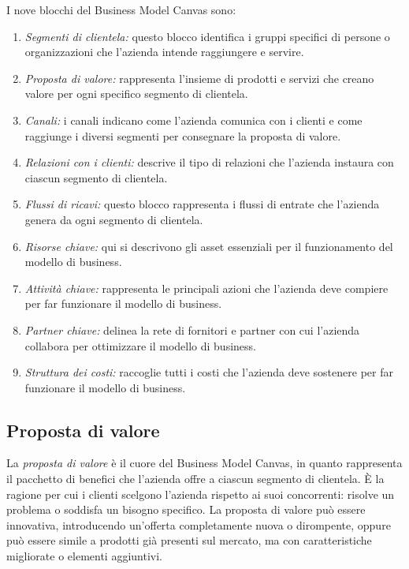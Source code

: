 I nove blocchi del Business Model Canvas sono:
\begin{enumerate}
    \item \textit{Segmenti di clientela:} questo blocco identifica i gruppi specifici di persone o organizzazioni che l'azienda intende raggiungere e servire.
    \item \textit{Proposta di valore:} rappresenta l'insieme di prodotti e servizi che creano valore per ogni specifico segmento di clientela.
    \item \textit{Canali:} i canali indicano come l’azienda comunica con i clienti e come raggiunge i diversi segmenti per consegnare la proposta di valore.
    \item \textit{Relazioni con i clienti:} descrive il tipo di relazioni che l'azienda instaura con ciascun segmento di clientela.
    \item \textit{Flussi di ricavi:} questo blocco rappresenta i flussi di entrate che l’azienda genera da ogni segmento di clientela.
    \item \textit{Risorse chiave:} qui si descrivono gli asset essenziali per il funzionamento del modello di business.
    \item \textit{Attività chiave:} rappresenta le principali azioni che l'azienda deve compiere per far funzionare il modello di business.
    \item \textit{Partner chiave:} delinea la rete di fornitori e partner con cui l'azienda collabora per ottimizzare il modello di business.
    \item \textit{Struttura dei costi:} raccoglie tutti i costi che l'azienda deve sostenere per far funzionare il modello di business.
\end{enumerate}

\subsection*{Proposta di valore}
La \textit{proposta di valore} è il cuore del Business Model Canvas, in quanto rappresenta il pacchetto di benefici che l'azienda offre a ciascun segmento di clientela. È la ragione per cui i clienti scelgono l'azienda rispetto ai suoi concorrenti: risolve un problema o soddisfa un bisogno specifico. La proposta di valore può essere innovativa, introducendo un'offerta completamente nuova o dirompente, oppure può essere simile a prodotti già presenti sul mercato, ma con caratteristiche migliorate o elementi aggiuntivi.

